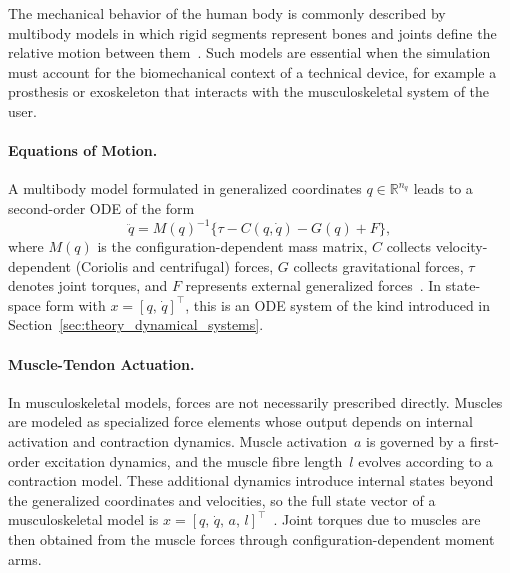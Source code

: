 The mechanical behavior of the human body is commonly described by multibody models in which rigid segments represent bones and joints define the relative motion between them~\cite{OpenSim_Delp,seth_opensim_2018}.
Such models are essential when the simulation must account for the biomechanical context of a technical device, for example a prosthesis or exoskeleton that interacts with the musculoskeletal system of the user.

\paragraph{Equations of Motion.}
A multibody model formulated in generalized coordinates
$q \in \mathbb{R}^{n_q}$ leads to a second-order ODE of the form
\begin{equation}
    \ddot{q}
    = M(q)^{-1}
      \bigl\{
        \tau
        - C(q,\dot{q})
        - G(q)
        + F
      \bigr\},
    \label{eq:multibody_eom}
\end{equation}
where $M(q)$ is the configuration-dependent mass matrix, $C$ collects velocity-dependent (Coriolis and centrifugal) forces, $G$ collects gravitational forces, $\tau$ denotes joint torques, and $F$ represents external generalized
forces~\cite{OpenSim_Delp,seth_opensim_2018}.
In state-space form with $x = [q,\,\dot{q}]^\top$, this is an ODE system of the kind introduced in Section~\ref{sec:theory_dynamical_systems}.

\paragraph{Muscle-Tendon Actuation.}
In musculoskeletal models, forces are not necessarily prescribed directly.
Muscles are modeled as specialized force elements whose output depends on internal activation and contraction dynamics.
Muscle activation~$a$ is governed by a first-order excitation dynamics, and the muscle fibre length~$l$ evolves according to a contraction model.
These additional dynamics introduce internal states beyond the generalized coordinates and velocities, so the full state vector of a musculoskeletal model is
$x = [q,\,\dot{q},\,a,\,l]^\top$~\cite{OpenSim_Delp}.
Joint torques due to muscles are then obtained from the muscle forces
through configuration-dependent moment arms.

